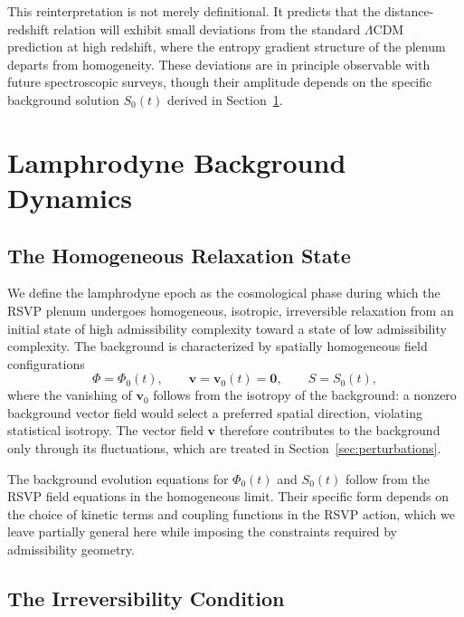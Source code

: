\documentclass[12pt, a4paper]{article}
\newcommand{\vv}{\mathbf{v}}
\begin{document}
This reinterpretation is not merely definitional. It predicts that the
distance-redshift relation will exhibit small deviations from the standard
$\Lambda$CDM prediction at high redshift, where the entropy gradient structure of
the plenum departs from homogeneity. These deviations are in principle observable
with future spectroscopic surveys, though their amplitude depends on the specific
background solution $S_0(t)$ derived in Section~\ref{sec:background}.

\section{Lamphrodyne Background Dynamics}
\label{sec:background}

\subsection{The Homogeneous Relaxation State}

We define the lamphrodyne epoch as the cosmological phase during which the RSVP
plenum undergoes homogeneous, isotropic, irreversible relaxation from an initial
state of high admissibility complexity toward a state of low admissibility
complexity. The background is characterized by spatially homogeneous field
configurations
\begin{equation}
\Phi = \Phi_0(t), \qquad \vv = \vv_0(t) = \mathbf{0}, \qquad S = S_0(t),
\end{equation}
where the vanishing of $\vv_0$ follows from the isotropy of the background: a
nonzero background vector field would select a preferred spatial direction,
violating statistical isotropy. The vector field $\vv$ therefore contributes to the
background only through its fluctuations, which are treated in
Section~\ref{sec:perturbations}.

The background evolution equations for $\Phi_0(t)$ and $S_0(t)$ follow from the
RSVP field equations in the homogeneous limit. Their specific form depends on the
choice of kinetic terms and coupling functions in the RSVP action, which we leave
partially general here while imposing the constraints required by admissibility
geometry.

\subsection{The Irreversibility Condition}
\end{document}
